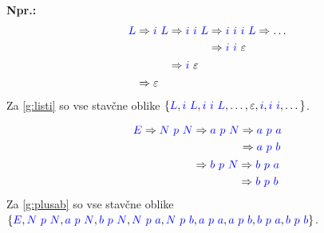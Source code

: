 \documentclass{article}
\newcommand{\Ex}{\textbf{Npr.:}\ }
\newcommand{\Symbol}[1]{\textcolor{blue}{#1}}
\newcommand{\Null}{\varepsilon}
\newcommand{\Derive}{\Rightarrow}
\newcommand{\Seq}{\ }
\begin{document}
\Ex
  \begin{equation*}
    \Symbol{L} \begin{aligned}[t]
      &\Derive \Symbol{i} \Seq \Symbol{L} \begin{aligned}[t]
        &\Derive \Symbol{i} \Seq \Symbol{i} \Seq \Symbol{L} \begin{aligned}[t]
          &\Derive \Symbol{i} \Seq \Symbol{i} \Seq \Symbol{i} \Seq \Symbol{L} \Derive \dots\\
          &\Derive \Symbol{i} \Seq \Symbol{i} \Seq \Null 
        \end{aligned}\\
        &\Derive \Symbol{i} \Seq \Null 
      \end{aligned}\\
      &\Derive \Null
    \end{aligned}
  \end{equation*}
Za \ref{g:listi} so vse stavčne oblike $\{\Symbol{L}, \Symbol{i} \Seq \Symbol{L}, \Symbol{i} \Seq \Symbol{i} \Seq \Symbol{L}, \dots, \Null, \Symbol{i}, \Symbol{i} \Seq \Symbol{i}, \dots\}$.

  \begin{equation*}
    \Symbol{E} \Derive \Symbol{N} \Seq \Symbol{p} \Seq \Symbol{N} \begin{aligned}[t]
      &\Derive \Symbol{a} \Seq \Symbol{p} \Seq \Symbol{N} \begin{aligned}[t]
        &\Derive \Symbol{a} \Seq \Symbol{p} \Seq \Symbol{a}\\
        &\Derive \Symbol{a} \Seq \Symbol{p} \Seq \Symbol{b}\\
      \end{aligned}\\
      &\Derive \Symbol{b} \Seq \Symbol{p} \Seq \Symbol{N} \begin{aligned}[t]
        &\Derive \Symbol{b} \Seq \Symbol{p} \Seq \Symbol{a}\\
        &\Derive \Symbol{b} \Seq \Symbol{p} \Seq \Symbol{b}\\
      \end{aligned}
    \end{aligned}
  \end{equation*}
Za \ref{g:plusab} so vse stavčne oblike $\{\Symbol{E}, \Symbol{N} \Seq \Symbol{p} \Seq \Symbol{N}, \Symbol{a} \Seq \Symbol{p} \Seq \Symbol{N}, \Symbol{b} \Seq \Symbol{p} \Seq \Symbol{N}, \Symbol{N} \Seq \Symbol{p} \Seq \Symbol{a}, \Symbol{N} \Seq \Symbol{p} \Seq \Symbol{b}, \Symbol{a} \Seq \Symbol{p} \Seq \Symbol{a}, \Symbol{a} \Seq \Symbol{p} \Seq \Symbol{b}, \Symbol{b} \Seq \Symbol{p} \Seq \Symbol{a}, \Symbol{b} \Seq \Symbol{p} \Seq \Symbol{b} \}$.
\end{document}

